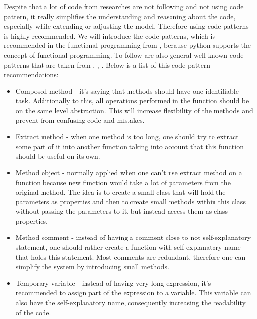 Despite that a lot of code from researches are not following and not using code
pattern, it really simplifies the understanding and reasoning about the code, especially
while extending or adjusting the model. Therefore using code patterns
is highly recommended. We will introduce the code patterns, which
is recommended in the functional programming from \cite{beck1997smalltalk},
because python supports the concept of functional programming.
To follow are also general well-known code patterns that are taken from
\cite{martin2003agile}, \cite{Eckel2017}, \cite{Gamma:1995:DPE:186897}.
Below is a list of this code pattern recommendations:

\begin{itemize}
	\item Composed method - it's saying that methods should
		have one identifiable task. Additionally to this, all operations
		performed in the function should be on the same level abstraction.
		This will increase flexibility of the methods and prevent
		from confusing code and mistakes. \cite{beck1997smalltalk}
	\item Extract method - when one method is too long, one should try to
		extract some part of it into another function taking into account that this
		function should be useful on its own. \cite{1999:RID:311424}
	\item Method object -  normally applied when one can't use extract method
	 	on a function because new function would take a lot of parameters
		from the original method.
		The idea is to create a small class that will hold the parameters
		as properties and then to create small methods within this class without
		passing the parameters to it, but instead access them as class properties.
		\cite{beck1997smalltalk}
	\item Method comment - instead of having a comment close to not
		self-explanatory statement, one should rather create a function
		with self-explanatory name that holds this statement.
		Most comments are redundant, therefore one can simplify
		the system by introducing small methods.
		\cite{beck1997smalltalk}
	\item Temporary variable - instead of having very long expression, it's recommended
		to assign part of the expression to a variable. This variable can also have
		the self-explanatory name, consequently increasing the readability of the code.\cite{beck1997smalltalk}


\end{itemize}
